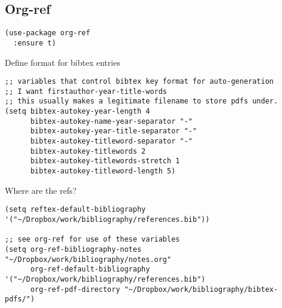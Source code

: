 \documentclass[12pt]{article}
\begin{document}
\subsection{Org-ref}
\label{sec-5-10}

\lstset{language=Lisp,label= ,caption= ,numbers=none}
\begin{lstlisting}
(use-package org-ref
  :ensure t)
\end{lstlisting}

Define format for bibtex entries


\lstset{language=Lisp,label= ,caption= ,numbers=none}
\begin{lstlisting}
;; variables that control bibtex key format for auto-generation
;; I want firstauthor-year-title-words
;; this usually makes a legitimate filename to store pdfs under.
(setq bibtex-autokey-year-length 4
      bibtex-autokey-name-year-separator "-"
      bibtex-autokey-year-title-separator "-"
      bibtex-autokey-titleword-separator "-"
      bibtex-autokey-titlewords 2
      bibtex-autokey-titlewords-stretch 1
      bibtex-autokey-titleword-length 5)
\end{lstlisting}

Where are the refs?

\lstset{language=Lisp,label= ,caption= ,numbers=none}
\begin{lstlisting}
(setq reftex-default-bibliography '("~/Dropbox/work/bibliography/references.bib"))

;; see org-ref for use of these variables
(setq org-ref-bibliography-notes "~/Dropbox/work/bibliography/notes.org"
      org-ref-default-bibliography '("~/Dropbox/work/bibliography/references.bib")
      org-ref-pdf-directory "~/Dropbox/work/bibliography/bibtex-pdfs/")
\end{lstlisting}
\end{document}
